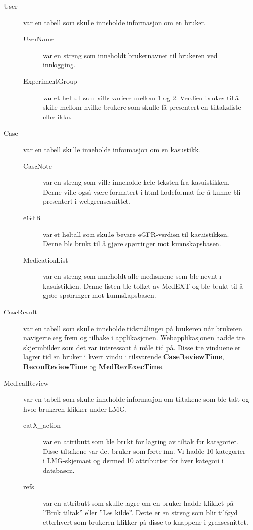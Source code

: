 \begin{description}
\newpage

\item[User]
var en tabell som skulle inneholde informasjon om en bruker.
\begin{description}
\item[UserName] var en streng som inneholdt brukernavnet til brukeren ved innlogging.
\item[ExperimentGroup] var et heltall som ville variere mellom 1 og 2. Verdien brukes til å skille mellom hvilke brukere som skulle få presentert en tiltaksliste eller ikke.
\end{description}

\item[Case] var en tabell skulle inneholde informasjon om en kasustikk. 
\begin{description}
\item[CaseNote] var en streng som ville inneholde hele teksten fra kasuistikken. Denne ville også være formatert i html-kodeformat for å kunne bli presentert i webgrensesnittet.
\item[eGFR] var et heltall som skulle bevare eGFR-verdien til kasuistikken. Denne ble brukt til å gjøre spørringer mot kunnskapsbasen.
\item[MedicationList] var en streng som inneholdt alle medisinene som ble nevnt i kasuistikken. Denne listen ble tolket av MedEXT og ble brukt til å gjøre spørringer mot kunnskapsbasen.
\end{description}

\item[CaseResult] var en tabell som skulle inneholde tidsmålinger på brukeren når brukeren navigerte seg frem og tilbake i applikasjonen. Webapplikasjonen hadde tre skjermbilder som det var interessant å måle tid på. Disse tre vinduene er lagrer tid en bruker i hvert vindu i tilsvarende \textbf{CaseReviewTime}, \textbf{ReconReviewTime} og \textbf{MedRevExecTime}.

\item[MedicalReview]  var en tabell som skulle inneholde informasjon om tiltakene som ble tatt og hvor brukeren klikker under LMG.
\begin{description}
\item[catX\_action] var en attributt som ble brukt for lagring av tiltak for kategorier. Disse tiltakene var det bruker som førte inn. Vi hadde 10 kategorier i LMG-skjemaet og dermed 10 attributter for hver kategori i databasen.
\item[refs] var en attributt som skulle lagre om en bruker hadde klikket på ''Bruk tiltak'' eller ''Les kilde''. Dette er en streng som blir tilføyd etterhvert som brukeren klikker på disse to knappene i grensesnittet.
\end{description}

\end{description}



